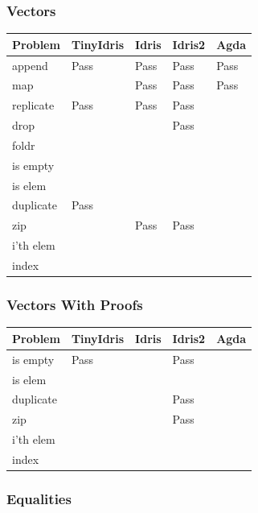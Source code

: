 \documentclass[a4paper]{article}
\begin{document}
\subsubsection{Vectors}
\label{sec:org20404d1}
\begin{center}
\begin{tabular}{lllll}
Problem & TinyIdris & Idris & Idris2 & Agda\\
\hline
append & Pass & Pass & Pass & Pass\\
map &   & Pass & Pass & Pass\\
replicate & Pass & Pass & Pass &  \\
drop &   &   & Pass &  \\
foldr &   &   &   &  \\
is empty &   &   &   &  \\
is elem &   &   &   &  \\
duplicate & Pass &   &   &  \\
zip &   & Pass & Pass &  \\
i'th elem &   &   &   &  \\
index &   &   &   &  \\
\end{tabular}
\end{center}

\subsubsection{Vectors With Proofs}
\label{sec:orge605b92}
\begin{center}
\begin{tabular}{lllll}
Problem & TinyIdris & Idris & Idris2 & Agda\\
\hline
is empty & Pass &   & Pass &  \\
is elem &   &   &   &  \\
duplicate &   &   & Pass &  \\
zip &   &   & Pass &  \\
i'th elem &   &   &   &  \\
index &   &   &   &  \\
\end{tabular}
\end{center}

\subsubsection{Equalities}
\label{sec:org3daf245}
\end{document}
